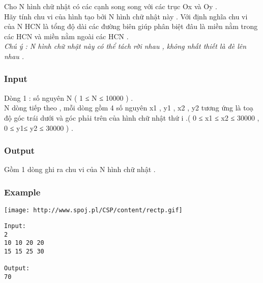 



   Cho N hình chữ nhật có các cạnh song song với các trục Ox và Oy .   
\\   Hãy tính chu vi của hình tạo bởi N hình chữ nhật này . Với định nghĩa chu vi của N HCN là tổng độ dài các đường biên giúp phân biệt đâu là miền nằm trong các HCN và miền nằm ngoài các HCN .   
\\\textit{    Chú ý : N hình chữ nhật này có thể tách rời nhau , không nhất thiết là đè lên nhau .   }

\subsubsection{   Input  }

   Dòng 1 : số nguyên N ( 1 ≤ N ≤ 10000 ) .   
\\   N dòng tiếp theo , mỗi dòng gồm 4 số nguyên x1 , y1 , x2 , y2 tương ứng là toạ độ góc trái dưới và góc phải trên của hình chữ nhật thứ i .( 0 ≤ x1 ≤ x2 ≤ 30000 , 0 ≤ y1≤ y2 ≤ 30000 ) .  

\subsubsection{   Output  }

   Gồm 1 dòng ghi ra chu vi của N hình chữ nhật .  

\subsubsection{   Example  }
\texttt{[image: http://www.spoj.pl/CSP/content/rectp.gif]}
\begin{verbatim}
Input:
2
10 10 20 20
15 15 25 30

Output:
70
\end{verbatim}